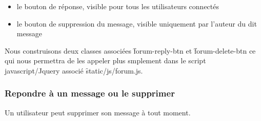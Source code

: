                     \begin{itemize}
                        \item le bouton de réponse, visible pour tous les utilisateurs connectés
                        \item le bouton de suppression du message, visible uniquement par l'auteur du dit message
                    \end{itemize}

                    Nous construisons deux classes associées \f{forum-reply-btn} et \f{forum-delete-btn} ce qui nous permettra de les appeler plus smplement dans le script javascript/Jquery associé \f{static/js/forum.js}.

                    
                    \subsubsection{Repondre à un message ou le supprimer}

                        Un utilisateur peut supprimer son message à tout moment. 